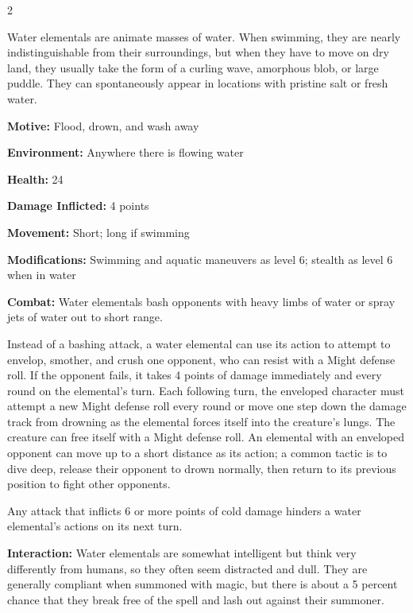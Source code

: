 \begin{multicols}{2}

Water elementals are animate masses of water. When swimming, they are nearly indistinguishable from their surroundings, but when they have to move on dry land, they usually take the form of a curling wave, amorphous blob, or large puddle. They can spontaneously appear in locations with pristine salt or fresh water. 

\textbf{Motive:} Flood, drown, and wash away 

\textbf{Environment:} Anywhere there is flowing water 

\textbf{Health:} 24 

\textbf{Damage Inflicted:} 4 points 

\textbf{Movement:} Short; long if swimming 

\textbf{Modifications:} Swimming and aquatic maneuvers as level 6; stealth as level 6 when in water 

\textbf{Combat:} Water elementals bash opponents with heavy limbs of water or spray jets of water out to short range. 

Instead of a bashing attack, a water elemental can use its action to attempt to envelop, smother, and crush one opponent, who can resist with a Might defense roll. If the opponent fails, it takes 4 points of damage immediately and every round on the elemental’s turn. Each following turn, the enveloped character must attempt a new Might defense roll every round or move one step down the damage track from drowning as the elemental forces itself into the creature’s lungs. The creature can free itself with a Might defense roll. An elemental with an enveloped opponent can move up to a short distance as its action; a common tactic is to dive deep, release their opponent to drown normally, then return to its previous position to fight other opponents. 

Any attack that inflicts 6 or more points of cold damage hinders a water elemental’s actions on its next turn.

\textbf{Interaction:} Water elementals are somewhat intelligent but think very differently from humans, so they often seem distracted and dull. They are generally compliant when summoned with magic, but there is about a 5 percent chance that they break free of the spell and lash out against their summoner. 


\end{multicols}
